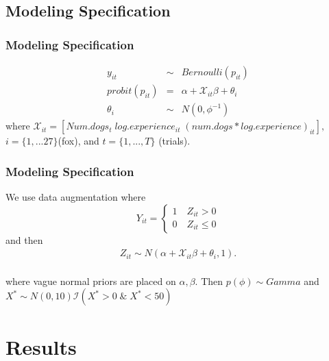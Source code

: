 \documentclass{beamer}
\begin{document}
\subsection{Modeling Specification}
\begin{frame}
	\frametitle{Modeling Specification}
\begin{eqnarray}
y_{it} &\sim& Bernoulli(p_{it}) \\
probit(p_{it}) & = & \alpha + \mathcal{X}_{it}\beta+ \theta_{i} \\
\theta_{i} &\sim& N(0, \phi^{-1})
\end{eqnarray}
where $\mathcal{X}_{it} = [Num.dogs_t\; log.experience_{it}\; (num.dogs*log.experience)_{it}],$ $i = \{1,...27\} $(fox), and $t= \{1,...,T\}$ (trials). %
 \end{frame}
\begin{frame}
	\frametitle{Modeling Specification}
	 We use data augmentation where 
	 \[
    Y_{it}=\left\{
                \begin{array}{ll}
                  1 \quad  Z_{it} > 0\\
                  0 \quad Z_{it} \leq 0
                \end{array}
              \right.
  \]
and then
  \begin{eqnarray}
  Z_{it} \sim N( \alpha + \mathcal{X}_{it}\beta +\theta_{i},1).
  \end{eqnarray}
\\
where vague normal priors are placed on $\alpha, \beta$. Then $p(\phi) \sim Gamma$ and $X^{*} \sim N(0,10) \mathcal{I}(X^* > 0 \;\&\; X^* < 50)$ 
\end{frame}
\section{Results}
\end{document}
